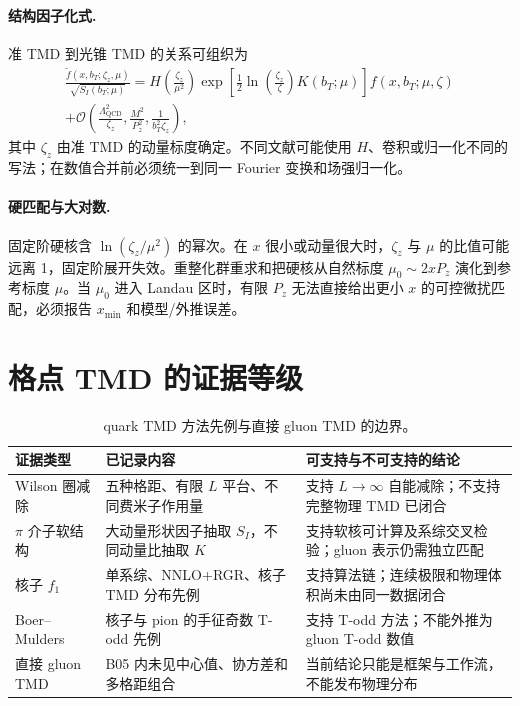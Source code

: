 \paragraph{结构因子化式.}
准 TMD 到光锥 TMD 的关系可组织为
\begin{equation}
  \begin{aligned}
  \frac{\widetilde f(x,b_T;\zeta_z,\mu)}
       {\sqrt{S_I(b_T;\mu)}}
  =H\!\left(\frac{\zeta_z}{\mu^2}\right)
   \exp\!\left[\frac12\ln\!\left(\frac{\zeta_z}{\zeta}\right)K(b_T;\mu)\right]
   f(x,b_T;\mu,\zeta)\\
  +\mathcal O\!\left(\frac{\Lambda_{\mathrm{QCD}}^2}{\zeta_z},
   \frac{M^2}{P_z^2},\frac{1}{b_T^2\zeta_z}\right),
  \end{aligned}
  \label{eq:b05-tmd-factorization}
\end{equation}
其中 \(\zeta_z\) 由准 TMD 的动量标度确定。不同文献可能使用 \(H\)、卷积或归一化不同的写法；在数值合并前必须统一到同一 Fourier 变换和场强归一化。

\paragraph{硬匹配与大对数.}
固定阶硬核含 \(\ln(\zeta_z/\mu^2)\) 的幂次。在 \(x\) 很小或动量很大时，\(\zeta_z\) 与 \(\mu\) 的比值可能远离 1，固定阶展开失效。重整化群重求和把硬核从自然标度 \(\mu_0\sim 2xP_z\) 演化到参考标度 \(\mu\)。当 \(\mu_0\) 进入 Landau 区时，有限 \(P_z\) 无法直接给出更小 \(x\) 的可控微扰匹配，必须报告 \(x_{\min}\) 和模型/外推误差。

\section{格点 TMD 的证据等级}

\begin{table}[H]
  \centering
  \caption{quark TMD 方法先例与直接 gluon TMD 的边界。}
  \label{tab:b05-tmd-evidence}
  \small
  \begin{tabularx}{\textwidth}{@{}p{}p{}X@{}}
    \toprule
    证据类型 & 已记录内容 & 可支持与不可支持的结论 \\
    \midrule
    Wilson 圈减除 & 五种格距、有限 \(L\) 平台、不同费米子作用量 & 支持 \(L\to\infty\) 自能减除；不支持完整物理 TMD 已闭合 \\
    \(\pi\) 介子软结构 & 大动量形状因子抽取 \(S_I\)，不同动量比抽取 \(K\) & 支持软核可计算及系综交叉检验；gluon 表示仍需独立匹配 \\
    核子 \(f_1\) & 单系综、NNLO+RGR、核子 TMD 分布先例 & 支持算法链；连续极限和物理体积尚未由同一数据闭合 \\
    Boer--Mulders & 核子与 pion 的手征奇数 T-odd 先例 & 支持 T-odd 方法；不能外推为 gluon T-odd 数值 \\
    直接 gluon TMD & B05 内未见中心值、协方差和多格距组合 & 当前结论只能是框架与工作流，不能发布物理分布 \\
    \bottomrule
  \end{tabularx}
\end{table}

